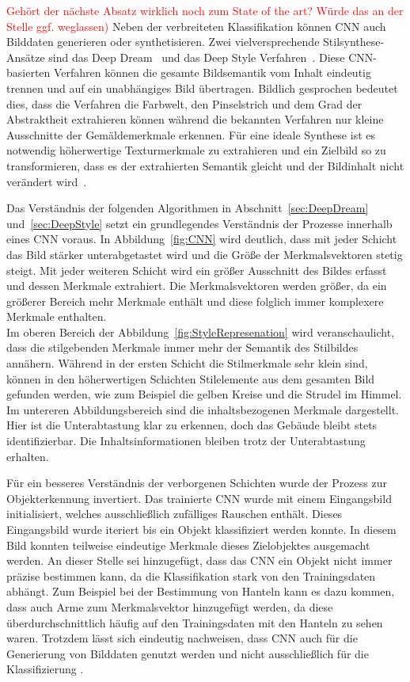 \documentclass[times, 11pt,twocolumn]{article}
\begin{document}
\textcolor{red}{Gehört der nächste Absatz wirklich noch zum State of the art? Würde das an der Stelle ggf. weglassen)}
Neben der verbreiteten Klassifikation können CNN auch Bilddaten generieren oder synthetisieren. Zwei vielversprechende Stilsynthese-Ansätze sind das Deep Dream~\cite{DeepDream} und das Deep Style Verfahren~\cite{GatysEB15a}. Diese CNN-basierten Verfahren können die gesamte Bildsemantik vom Inhalt eindeutig trennen und auf ein unabhängiges Bild übertragen. Bildlich gesprochen bedeutet dies, dass die Verfahren die Farbwelt, den Pinselstrich und dem Grad der Abstraktheit extrahieren können während die bekannten Verfahren nur kleine Ausschnitte der Gemäldemerkmale erkennen. Für eine ideale Synthese ist es notwendig höherwertige Texturmerkmale zu extrahieren und ein Zielbild so zu transformieren, dass es der extrahierten Semantik gleicht und der Bildinhalt nicht verändert wird~\cite{McCaigDG16}.

\label{sec:Stilsynthese}
Das Verständnis der folgenden Algorithmen in Abschnitt~\ref{sec:DeepDream} und~\ref{sec:DeepStyle} setzt ein grundlegendes Verständnis der Prozesse innerhalb eines CNN voraus. In Abbildung~\ref{fig:CNN} wird deutlich, dass mit jeder Schicht das Bild stärker unterabgetastet wird und die Größe der Merkmalsvektoren stetig steigt. Mit jeder weiteren Schicht wird ein größer Ausschnitt des Bildes erfasst und dessen Merkmale extrahiert. Die Merkmalsvektoren werden größer, da ein größerer Bereich mehr Merkmale enthält und diese folglich immer komplexere Merkmale enthalten. \\
Im oberen Bereich der Abbildung~\ref{fig:StyleRepresenation} wird veranschaulicht, dass die stilgebenden Merkmale immer mehr der Semantik des Stilbildes annähern. Während in der ersten Schicht die Stilmerkmale sehr klein sind, können in den höherwertigen Schichten Stilelemente aus dem gesamten Bild gefunden werden, wie zum Beispiel die gelben Kreise und die Strudel im Himmel. Im untereren Abbildungsbereich sind die inhaltsbezogenen Merkmale dargestellt. Hier ist die Unterabtastung klar zu erkennen, doch das Gebäude bleibt stets identifizierbar. Die Inhaltsinformationen bleiben trotz der Unterabtastung erhalten.

Für ein besseres Verständnis der verborgenen Schichten wurde der Prozess zur Objekterkennung invertiert. Das trainierte CNN wurde mit einem Eingangsbild initialisiert, welches ausschließlich zufälliges Rauschen enthält. Dieses Eingangsbild wurde iteriert bis ein Objekt klassifiziert werden konnte. In diesem Bild konnten teilweise eindeutige Merkmale dieses Zielobjektes ausgemacht werden. An dieser Stelle sei hinzugefügt, dass das CNN ein Objekt nicht immer präzise bestimmen kann, da die Klassifikation stark von den Trainingsdaten abhängt. Zum Beispiel bei der Bestimmung von Hanteln kann es dazu kommen, dass auch Arme zum Merkmalsvektor hinzugefügt werden, da diese überdurchschnittlich häufig auf den Trainingsdaten mit den Hanteln zu sehen waren. 
Trotzdem lässt sich eindeutig nachweisen, dass CNN auch für die Generierung von Bilddaten genutzt werden und nicht ausschließlich für die Klassifizierung \cite{DeepDream}\cite{MahendranV14}.
\end{document}
